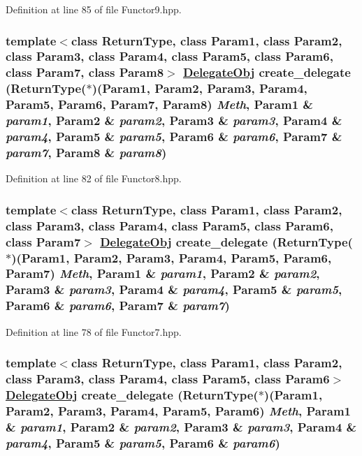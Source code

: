 Definition at line 85 of file Functor9.hpp.\hypertarget{namespaceDL_a32}{
\subsubsection[create\_\-delegate]{\setlength{\rightskip}{0pt plus 5cm}template$<$class Return\-Type, class Param1, class Param2, class Param3, class Param4, class Param5, class Param6, class Param7, class Param8$>$ \hyperlink{namespaceDL_a0}{Delegate\-Obj} create\_\-delegate (Return\-Type($\ast$)(Param1, Param2, Param3, Param4, Param5, Param6, Param7, Param8) {\em Meth}, Param1 \& {\em param1}, Param2 \& {\em param2}, Param3 \& {\em param3}, Param4 \& {\em param4}, Param5 \& {\em param5}, Param6 \& {\em param6}, Param7 \& {\em param7}, Param8 \& {\em param8})}}
\label{namespaceDL_a32}




Definition at line 82 of file Functor8.hpp.\hypertarget{namespaceDL_a31}{
\subsubsection[create\_\-delegate]{\setlength{\rightskip}{0pt plus 5cm}template$<$class Return\-Type, class Param1, class Param2, class Param3, class Param4, class Param5, class Param6, class Param7$>$ \hyperlink{namespaceDL_a0}{Delegate\-Obj} create\_\-delegate (Return\-Type($\ast$)(Param1, Param2, Param3, Param4, Param5, Param6, Param7) {\em Meth}, Param1 \& {\em param1}, Param2 \& {\em param2}, Param3 \& {\em param3}, Param4 \& {\em param4}, Param5 \& {\em param5}, Param6 \& {\em param6}, Param7 \& {\em param7})}}
\label{namespaceDL_a31}




Definition at line 78 of file Functor7.hpp.\hypertarget{namespaceDL_a30}{
\subsubsection[create\_\-delegate]{\setlength{\rightskip}{0pt plus 5cm}template$<$class Return\-Type, class Param1, class Param2, class Param3, class Param4, class Param5, class Param6$>$ \hyperlink{namespaceDL_a0}{Delegate\-Obj} create\_\-delegate (Return\-Type($\ast$)(Param1, Param2, Param3, Param4, Param5, Param6) {\em Meth}, Param1 \& {\em param1}, Param2 \& {\em param2}, Param3 \& {\em param3}, Param4 \& {\em param4}, Param5 \& {\em param5}, Param6 \& {\em param6})}}
\label{namespaceDL_a30}




